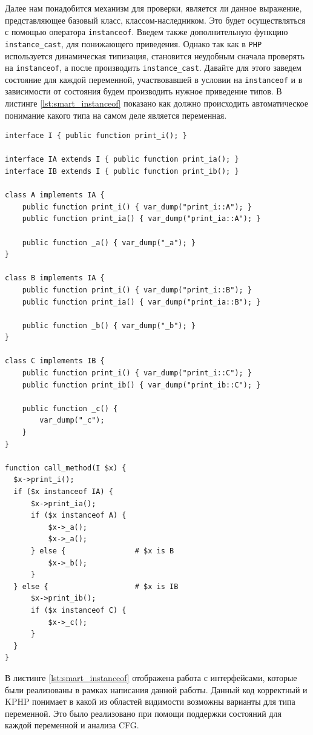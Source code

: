 Далее нам понадобится механизм для проверки, является ли данное выражение, представляющее базовый класс, классом-наследником.
Это будет осуществляться с помощью оператора \verb|instanceof|.
Введем также дополнительную функцию \verb|instance_cast|, для понижающего приведения.
Однако так как в \verb|PHP| используется динамическая типизация, становится неудобным сначала проверять на \verb|instanceof|, а после производить \verb|instance_cast|.
Давайте для этого заведем состояние для каждой переменной, участвовавшей в условии на \verb|instanceof| и в зависимости от состояния будем производить нужное приведение типов.
В листинге \ref{lst:smart_instanceof} показано как должно происходить автоматическое понимание какого типа на самом деле является переменная.
\begin{lstlisting}[caption={Пример использования умного оператора instanceof},label={lst:smart_instanceof}]
interface I { public function print_i(); }

interface IA extends I { public function print_ia(); }
interface IB extends I { public function print_ib(); }

class A implements IA {
    public function print_i() { var_dump("print_i::A"); }
    public function print_ia() { var_dump("print_ia::A"); }

    public function _a() { var_dump("_a"); }
}

class B implements IA {
    public function print_i() { var_dump("print_i::B"); }
    public function print_ia() { var_dump("print_ia::B"); }

    public function _b() { var_dump("_b"); }
}

class C implements IB {
    public function print_i() { var_dump("print_i::C"); }
    public function print_ib() { var_dump("print_ib::C"); }

    public function _c() {
        var_dump("_c");
    }
}

function call_method(I $x) {
  $x->print_i();
  if ($x instanceof IA) {
      $x->print_ia();
      if ($x instanceof A) {
          $x->_a();
          $x->_a();
      } else {                # $x is B
          $x->_b();
      }
  } else {                    # $x is IB
      $x->print_ib();
      if ($x instanceof C) {
          $x->_c();
      }
  }
}
\end{lstlisting}

В листинге \ref{lst:smart_instanceof} отображена работа с интерфейсами, которые были реализованы в рамках написания данной работы.
Данный код корректный и KPHP понимает в какой из областей видимости возможны варианты для типа переменной.
Это было реализовано при помощи поддержки состояний для каждой переменной и анализа CFG.

